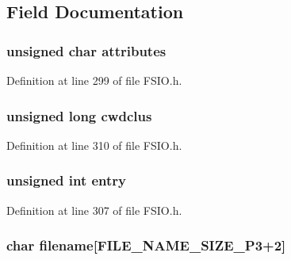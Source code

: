 \subsection{Field Documentation}
\hypertarget{struct_search_rec_aaae4ca8334d09f071d51cc989a155dad}{}
\subsubsection[{attributes}]{\setlength{\rightskip}{0pt plus 5cm}unsigned char attributes}\label{struct_search_rec_aaae4ca8334d09f071d51cc989a155dad}


Definition at line 299 of file F\+S\+I\+O.\+h.

\hypertarget{struct_search_rec_af66188f74bf17490aa008ec9c99bb12e}{}
\subsubsection[{cwdclus}]{\setlength{\rightskip}{0pt plus 5cm}unsigned long cwdclus}\label{struct_search_rec_af66188f74bf17490aa008ec9c99bb12e}


Definition at line 310 of file F\+S\+I\+O.\+h.

\hypertarget{struct_search_rec_acd77462c0a6a72f327690ed0d920a989}{}
\subsubsection[{entry}]{\setlength{\rightskip}{0pt plus 5cm}unsigned int entry}\label{struct_search_rec_acd77462c0a6a72f327690ed0d920a989}


Definition at line 307 of file F\+S\+I\+O.\+h.

\hypertarget{struct_search_rec_a65e5ed58ca2b728f26a9b3b905f0c105}{}
\subsubsection[{filename}]{\setlength{\rightskip}{0pt plus 5cm}char filename\mbox{[}{\bf F\+I\+L\+E\+\_\+\+N\+A\+M\+E\+\_\+\+S\+I\+Z\+E\+\_\+P3}+2\mbox{]}}\label{struct_search_rec_a65e5ed58ca2b728f26a9b3b905f0c105}


